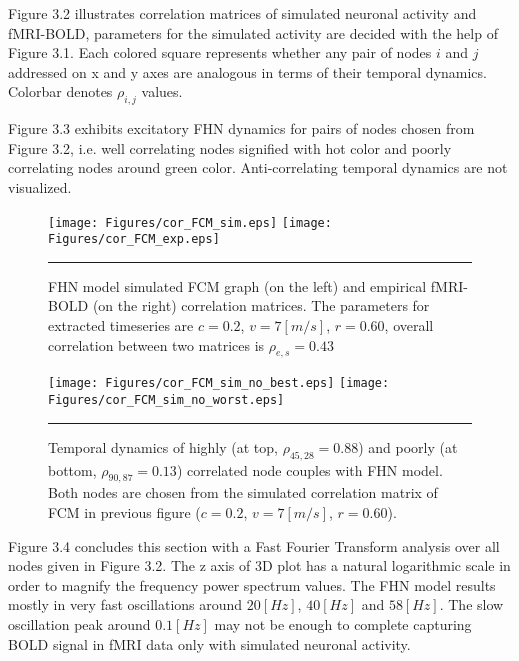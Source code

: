 Figure 3.2 illustrates correlation matrices of simulated neuronal activity and fMRI-BOLD, parameters for the simulated activity are decided with the help of Figure 3.1. Each colored square represents whether any pair of nodes $i$ and $j$ addressed on x and y axes are analogous in terms of their temporal dynamics. Colorbar denotes $\rho_{i,j}$ values.

Figure 3.3 exhibits excitatory FHN dynamics for pairs of nodes chosen from Figure 3.2, i.e. well correlating nodes signified with hot color and poorly correlating nodes around green color. Anti-correlating temporal dynamics are not visualized. 


\begin{figure}[htbp]
 
  \centering
	 \texttt{[image: Figures/cor\_FCM\_sim.eps]} 
   	 \texttt{[image: Figures/cor\_FCM\_exp.eps]} 

    \rule{35em}{0.5pt}
  \caption[High correlated FHN simulation, FCM]{ FHN model simulated FCM graph (on the left) and empirical fMRI-BOLD (on the right) correlation matrices. The parameters for extracted timeseries are $c=0.2$, $v=7 [m/s]$, $r=0.60$, overall correlation between two matrices is $\rho_{e,s} = 0.43$}
      \label{fig:High correlated FHN simulation, FCM}
 	
\end{figure}  



\begin{figure}[htbp]
 
  \centering
	 \texttt{[image: Figures/cor\_FCM\_sim\_no\_best.eps]} 
   	 \texttt{[image: Figures/cor\_FCM\_sim\_no\_worst.eps]} 

    \rule{35em}{0.5pt}
  \caption[Neural Activity Node Dynamics, FCM]{Temporal dynamics of highly (at top, $\rho_{45,28}=0.88$) and poorly (at bottom, $\rho_{90,87}=0.13$) correlated node couples with FHN model. Both nodes are chosen from the simulated correlation matrix of FCM in previous figure ($c=0.2$, $v=7 [m/s]$, $r=0.60$).} 
    \label{fig:Neural Activity Node Dynamics, FCM}
 	
\end{figure} 


Figure 3.4 concludes this section with a Fast Fourier Transform analysis over all nodes given in Figure 3.2. The z axis of 3D plot has a natural logarithmic scale in order to magnify the frequency power spectrum values. The FHN model results mostly in very fast oscillations around  $20 [Hz]$, $40 [Hz]$ and $58 [Hz]$. The slow oscillation peak around $0.1 [Hz]$ may not be enough to complete capturing BOLD signal in fMRI data only with simulated neuronal activity.   




